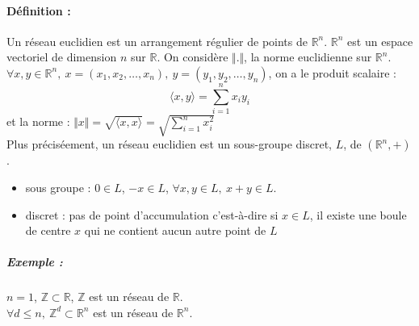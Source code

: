 \documentclass[12pt,a4paper]{report}
\begin{document}
\paragraph{Définition :\\}
Un réseau euclidien est un arrangement régulier de points de $\mathbb{R}^n$. $\mathbb{R}^n$ est un espace vectoriel de dimension $n$ sur $\mathbb{R}$. On considère $\Vert.\Vert $, la norme euclidienne sur $\mathbb{R}^n$.\\
$ \forall x,y\in \mathbb{R}^n,\ x=(x_1,x_2,\ldots,x_n),\ y=(y_1,y_2,\ldots,y_n)$, on a le produit scalaire :
$$ \langle x,y\rangle = \sum_{i=1}^n x_iy_i $$
et la norme : $ \Vert x \Vert = \sqrt{\langle x,x \rangle}=\sqrt{\displaystyle\sum_{i=1}^n x_i^2} $\\
Plus préciséement, un réseau euclidien est un sous-groupe discret, $L$, de $(\mathbb{R}^n,+)$.
\begin{itemize}
\item sous groupe : $0\in L$, $-x \in L$, $\forall x,y \in L,\  x+y \in L$.
\item discret : pas de point d'accumulation c'est-à-dire si $x \in L$, il existe une boule de centre $x$ qui ne contient aucun autre point de $L$
\end{itemize}
\subparagraph{Exemple :} $n=1$, $\mathbb{Z} \subset \mathbb{R}$, $\mathbb{Z}$ est un réseau de $\mathbb{R}$.\\
$\forall d \leqslant n,\ \mathbb{Z}^d \subset \mathbb{R}^n$ est un réseau de $\mathbb{R}^n$.
\end{document}
